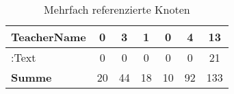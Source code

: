\begin{table}[htb]
\begin{tabular}{|l|c|c|c|c|c|c|}
            TeacherName                           & 0             & 3              & 1               & 0             & 4              & 13            \\ \hline
            :Text                                 & 0             & 0              & 0               & 0             & 0              & 21            \\ \hline
            \hline
            \textbf{Summe}                        & 20            & 44             & 18              & 10            & 92             & 133           \\ \hline
        \end{tabular}
        \caption{Mehrfach referenzierte Knoten}
        \label{table:findingsTeachersFiguresSharedNodes}
    \end{table}

